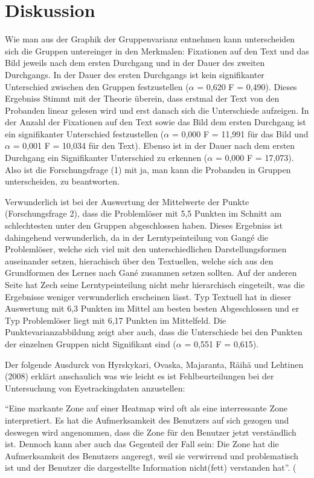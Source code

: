 \chapter{Diskussion}

Wie man aus der Graphik der Gruppenvarianz entnehmen kann unterscheiden sich die Gruppen untereinger in den Merkmalen: Fixationen auf den Text und das Bild jeweils nach dem ersten Durchgang und in der Dauer des zweiten Durchgangs. In der Dauer des ersten Durchgangs ist kein signifikanter Unterschied zwischen den Gruppen festzustellen ($\alpha$ = 0,620 F = 0,490). Dieses Ergebniss Stimmt mit der Theorie überein, dass erstmal der Text von den Probanden linear gelesen wird und erst danach sich die Unterschiede aufzeigen. In der Anzahl der Fixationen auf den Text sowie das Bild dem ersten Durchgang ist ein signifikanter Unterschied festzustellen ($\alpha$ = 0,000 F = 11,991 für das Bild und $\alpha$ = 0,001 F = 10,034 für den Text). Ebenso ist in der Dauer nach dem ersten Durchgang ein Signifikanter Unterschied zu erkennen ($\alpha$ = 0,000 F = 17,073). Also ist die Forschungsfrage (1) mit ja, man kann die Probanden in Gruppen unterscheiden, zu beantworten.

Verwunderlich ist bei der Auswertung der Mittelwerte der Punkte (Forschungsfrage 2), dass die Problemlöser mit 5,5 Punkten im Schnitt am schlechtesten unter den Gruppen abgeschlossen haben. Dieses Ergebniss ist dahingehend verwunderlich, da in der Lerntypeinteilung von Gangé die Problemlöser, welche sich viel mit den unterschiedlichen Darstellungsformen auseinander setzen, hierachisch über den Textuellen, welche sich aus den Grundformen des Lernes nach Gané zusammen setzen sollten. Auf der anderen Seite hat Zech seine Lerntypeinteilung nicht mehr hierarchisch eingeteilt, was die Ergebnisse weniger verwunderlich erscheinen lässt. Typ Textuell hat in dieser Auswertung mit 6,3 Punkten im Mittel am besten besten Abgeschlossen und er Typ Problemlöser liegt mit 6,17 Punkten im Mittelfeld. Die Punktevarianzabbildung zeigt aber auch, dass die Unterschiede bei den Punkten der einzelnen Gruppen nicht Signifikant sind ($\alpha$ = 0,551 F = 0,615). 

Der folgende Ausdurck von Hyrskykari, Ovaska, Majaranta, Räihä und Lehtinen (2008) erklärt anschaulich was wie leicht es ist Fehlbeurteilungen bei der Untersuchung von Eyetrackingdaten anzustellen:

``Eine markante Zone auf einer Heatmap wird oft als eine interressante Zone interpretiert. Es hat die Aufmerksamkeit des Benutzers auf sich gezogen und deswegen wird angenommen, dass die Zone für den Benutzer jetzt verständlich ist. Dennoch kann aber auch das Gegenteil der Fall sein: Die Zone hat die Aufmerksamkeit des Benutzers angeregt, weil sie verwirrend und problematisch ist und der Benutzer die dargestellte Information nicht(fett) verstanden hat''. (%

